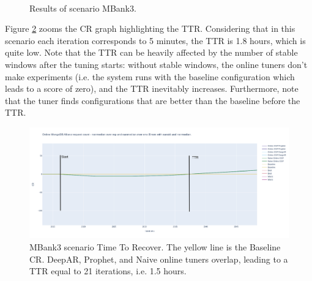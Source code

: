 \documentclass[a4paper, 12pt]{article} %
\begin{document}
	\begin{figure}\centering
		 \\
		\caption{Results of scenario MBank3.}
		\label{fig:results_cgp_bank1}
	\end{figure}
	
	Figure \ref{fig:results_cgp_bank3_ttr} zooms the CR graph highlighting the TTR. Considering that in this scenario each iteration corresponds to 5 minutes, the TTR is 1.8 hours, which is quite low. Note that the TTR can be heavily affected by the number of stable windows after the tuning starts: without stable windows, the online tuners don't make experiments (i.e. the system runs with the baseline configuration which leads to a score of zero), and the TTR inevitably increases. Furthermore, note that the tuner finds configurations that are better than the baseline before the TTR.
	
	
	\begin{figure} \centering
		\includegraphics[width=5.5in]{img/results/mongo_allianz_10ms_kmeans_ttr.png}
		\caption{MBank3 scenario Time To Recover. The yellow line is the Baseline CR. DeepAR, Prophet, and Naive online tuners overlap, leading to a TTR equal to 21 iterations, i.e. 1.5 hours.}
		\label{fig:results_cgp_bank3_ttr}
	\end{figure}
	
\end{document}
